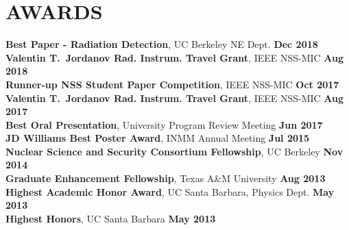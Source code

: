 \section{\small{AWARDS}}

\textbf{Best Paper - Radiation Detection}, UC Berkeley NE Dept. \hfill \textbf{Dec 2018}\\
\textbf{Valentin T.~Jordanov Rad. Instrum. Travel Grant}, IEEE NSS-MIC \hfill \textbf{Aug 2018}\\
\textbf{Runner-up NSS Student Paper Competition}, IEEE NSS-MIC \hfill \textbf{Oct 2017}\\
\textbf{Valentin T.~Jordanov Rad. Instrum. Travel Grant}, IEEE NSS-MIC \hfill \textbf{Aug 2017}\\
\textbf{Best Oral Presentation}, University Program Review Meeting \hfill \textbf{Jun 2017}\\
\textbf{JD Williams Best Poster Award}, INMM Annual Meeting \hfill \textbf{Jul 2015}\\
\textbf{Nuclear Science and Security Consortium Fellowship}, UC Berkeley \hfill \textbf{Nov 2014}\\
\textbf{Graduate Enhancement Fellowship}, Texas A\&M University \hfill \textbf{Aug 2013}\\
\textbf{Highest Academic Honor Award}, UC Santa Barbara, Physics Dept. \hfill \textbf{May 2013}\\
\textbf{Highest Honors}, UC Santa Barbara \hfill \textbf{May 2013}\\[-2.8ex]
